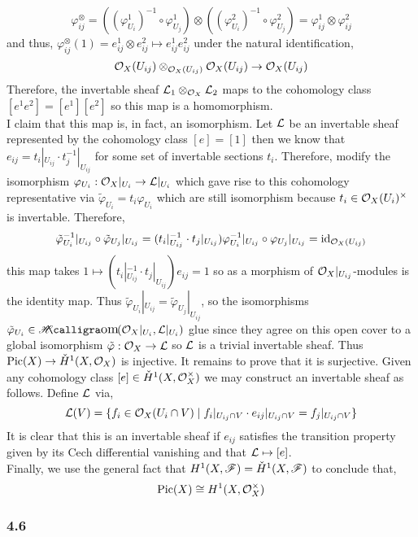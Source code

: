 \documentclass[12pt]{article}
\begin{document}
\[ \varphi_{ij}^\otimes = ((\varphi^1_{U_i})^{-1} \circ \varphi^1_{U_j}) \otimes ((\varphi^2_{U_i})^{-1} \circ \varphi^2_{U_j}) = \varphi_{ij}^1 \otimes \varphi_{ij}^2 \]
and thus, $\varphi_{ij}^\otimes(1) = e_{ij}^1 \otimes e^2_{ij} \mapsto e_{ij}^1 e_{ij}^2$ under the natural identification,
\[ \mathcal{O}_{X}(U_{ij}) \otimes_{\mathcal{O}_{X}(U_{ij})} \mathcal{O}_{X}(U_{ij}) \to \mathcal{O}_{X}(U_{ij}) \]
Therefore, the invertable sheaf $\mathcal{L}_1 \otimes_{\mathcal{O}_{X}} \mathcal{L}_2$ maps to the cohomology class $[e^1 e^2] = [e^1] [e^2]$ so this map is a homomorphism. 
\bigskip\\
I claim that this map is, in fact, an isomorphism. Let $\mathcal{L}$ be an invertable sheaf represented by the cohomology class $[e] = [1]$ then we know that $e_{ij} = t_i |_{U_{ij}} \cdot t_j^{-1} |_{U_{ij}}$ for some set of invertable sections $t_i$. Therefore, modify the isomorphism $\varphi_{U_i} : \mathcal{O}_{X}|_{U_i} \to \mathcal{L} |_{U_i}$ which gave rise to this cohomology representative via $\tilde{\varphi}_{U_i} = t_i \varphi_{U_i}$ which are still isomorphism because $t_i \in \mathcal{O}_{X}(U_i)^\times$ is invertable. Therefore, 
\[ \tilde{\varphi}_{U_i}^{-1}|_{U_{ij}} \circ \tilde{\varphi}_{U_j}|_{U_{ij}} = (t_i |_{U_{ij}}^{-1} \cdot t_j |_{U_{ij}}) \varphi_{U_i}^{-1}|_{U_{ij}} \circ \varphi_{U_j}|_{U_{ij}} = \mathrm{id}_{\mathcal{O}_{X}(U_{ij})} \]
this map takes $1 \mapsto (t_i |_{U_{ij}}^{-1} \cdot t_j |_{U_{ij}}) e_{ij} = 1$ so as a morphism of $\mathcal{O}_{X}|_{U_{ij}}$-modules is the identity map. Thus $\tilde{\varphi}_{U_i} |_{U_{ij}} = \tilde{\varphi}_{U_j} |_{U_{ij}}$, so the isomorphisms $\tilde{\varphi}_{U_i} \in \shHom{}{\struct{X}|_{U_i}}{\L|_{U_i}}$ glue since they agree on this open cover to a global isomorphism $\tilde{\varphi} : \mathcal{O}_{X} \to \mathcal{L}$ so $\mathcal{L}$ is a trivial invertable sheaf. Thus $\mathrm{Pic}(X) \to \check{H}^1(X, \mathcal{O}_{X})$ is injective. It remains to prove that it is surjective. Given any cohomology class $[e] \in \check{H}^1(X, \mathcal{O}_{X}^\times)$ we may construct an invertable sheaf as follows. Define $\mathcal{L}$ via,
\[ \mathcal{L}(V) = \{ f_i \in \mathcal{O}_{X}(U_i \cap V) \mid f_i |_{U_{ij} \cap V} \cdot e_{ij} |_{U_{ij} \cap V} = f_j |_{U_{ij} \cap V} \} \]
It is clear that this is an invertable sheaf if $e_{ij}$ satisfies the transition property given by its Cech differential vanishing and that $\mathcal{L} \mapsto [e]$. 
\bigskip\\
Finally, we use the general fact that $H^1(X, \mathscr{F}) = \check{H}^1(X, \mathscr{F})$ to conclude that,
\[ \mathrm{Pic}(X) \cong H^1(X, \mathcal{O}_{X}^\times) \]

\subsubsection{4.6}
\end{document}
